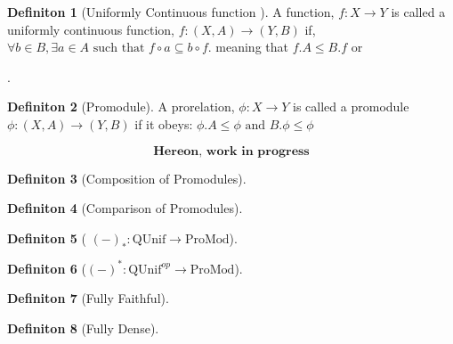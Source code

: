 \documentclass[18pt,a4paper]{article}
\theoremstyle{definition}
\newtheorem{definition}{Definiton}[section]
\newcommand\MySymb[2][\leq]{\arrow[mysymbol]{#2}[description]{#1}}
\begin{document}
\begin{definition}[Uniformly Continuous function ] %
	A function, $f:X \to Y$ is called a uniformly continuous function, $f:(X,A) \to (Y,B)$
	if, $\forall b \in B, \exists a \in A \text{ such that } f \circ a \subseteq b \circ f $.
	meaning that $f.A \leq B.f$ or
	.

\end{definition}
\begin{definition}[Promodule] %
	A prorelation, $\phi:X \to Y$ is called a promodule $\phi: (X,A) \to (Y,B)$  if it obeys:
	$ \phi.A \leq \phi \text{ and } B. \phi \leq \phi $
\end{definition}

\[ \textbf{ Hereon, work in progress }  \]

\begin{definition}[Composition of Promodules] %

\end{definition}

\begin{definition}[Comparison of Promodules] %

\end{definition}

\begin{definition}[ $(-)_*: \text{QUnif} \rightarrow \text{ProMod} $] %

\end{definition}

\begin{definition}[$(-)^*: \text{QUnif}^{op} \rightarrow \text{ProMod} $] %

\end{definition}

\begin{definition}[Fully Faithful] %

\end{definition}

\begin{definition}[Fully Dense] %

\end{definition}
\end{document}
